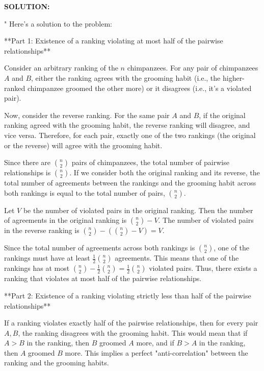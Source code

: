 \begin{enumerate}
\begin{enumerate}
\end{enumerate}

\ifdefined\template
\begin{shaded}
\textbf{SOLUTION:}
\ifdefined\sol


"
Here's a solution to the problem:

**Part 1: Existence of a ranking violating at most half of the pairwise relationships**

Consider an arbitrary ranking of the $n$ chimpanzees. For any pair of chimpanzees $A$ and $B$, either the ranking agrees with the grooming habit (i.e., the higher-ranked chimpanzee groomed the other more) or it disagrees (i.e., it's a violated pair).

Now, consider the reverse ranking. For the same pair $A$ and $B$, if the original ranking agreed with the grooming habit, the reverse ranking will disagree, and vice versa.  Therefore, for each pair, exactly one of the two rankings (the original or the reverse) will agree with the grooming habit.

Since there are $\binom{n}{2}$ pairs of chimpanzees, the total number of pairwise relationships is $\binom{n}{2}$.  If we consider both the original ranking and its reverse, the total number of agreements between the rankings and the grooming habit across both rankings is equal to the total number of pairs, $\binom{n}{2}$.

Let $V$ be the number of violated pairs in the original ranking. Then the number of agreements in the original ranking is $\binom{n}{2} - V$. The number of violated pairs in the reverse ranking is $\binom{n}{2} - (\binom{n}{2} - V) = V$.

Since the total number of agreements across both rankings is $\binom{n}{2}$, one of the rankings must have at least $\frac{1}{2} \binom{n}{2}$ agreements. This means that one of the rankings has at most $\binom{n}{2} - \frac{1}{2} \binom{n}{2} = \frac{1}{2} \binom{n}{2}$ violated pairs. Thus, there exists a ranking that violates at most half of the pairwise relationships.

**Part 2: Existence of a ranking violating strictly less than half of the pairwise relationships**

If a ranking violates exactly half of the pairwise relationships, then for every pair $A, B$, the ranking disagrees with the grooming habit. This would mean that if $A > B$ in the ranking, then $B$ groomed $A$ more, and if $B > A$ in the ranking, then $A$ groomed $B$ more. This implies a perfect "anti-correlation" between the ranking and the grooming habits.


\end{shaded}
\end{enumerate}
